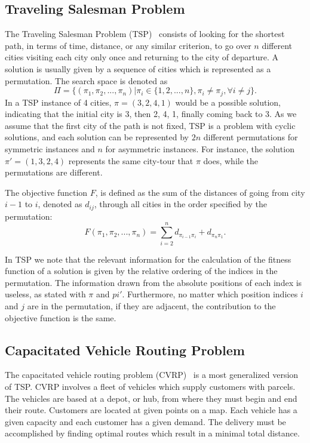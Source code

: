 \subsection{Traveling Salesman Problem}
The Traveling Salesman Problem (TSP)~\citep{goldberg1985alleles} consists of looking for the shortest path, in terms of time, distance, or any similar criterion, to go over $n$ different cities visiting each city only once and returning to the city of departure. A solution is usually given by a sequence of cities which is represented as a permutation. The search space is denoted as
\begin{equation*}
	\Pi = \{ (\pi_1, \pi_2,...,\pi_n) | \pi_i \in \{ 1,2,...,n \}, \pi_i \neq \pi_j, \forall i \neq j \}\text{.}
\end{equation*}
In a TSP instance of 4 cities, $\pi = (3,2,4,1)$ would be a possible solution, indicating that the initial city is 3, then 2, 4, 1, finally coming back to 3. As we assume that the first city of the path is not fixed, TSP is a problem with cyclic solutions, and each solution can be represented by $2n$ different permutations for symmetric instances and $n$ for asymmetric instances. For instance, the solution ${\pi}'=(1,3,2,4)$ represents the same city-tour that $\pi$ does, while the permutations are different.

The objective function $F$, is defined as the sum of the distances of going from city $i-1$ to $i$, denoted as $d_{ij}$, through all cities in the order specified by the permutation:
\begin{equation*}
	F(\pi_1, \pi_2, ... , \pi_n) = \sum_{i=2}^{n}{d_{\pi_{i-1}\pi_i}} + d_{\pi_n\pi_1} \text{.}
\end{equation*}

In TSP we note that the relevant information for the calculation of the fitness function of a solution is given by the relative ordering of the indices in the permutation. The information drawn from the absolute positions of each index is useless, as stated with $\pi$ and ${pi}'$. Furthermore, no matter which position indices $i$ and $j$ are in the permutation, if they are adjacent, the contribution to the objective function is the same.

\subsection{Capacitated Vehicle Routing Problem}
\label{section:cvrp}
The capacitated vehicle routing problem (CVRP)~\citep{toth2001vehicle} is a most generalized version of TSP. CVRP involves a fleet of vehicles which supply customers with parcels. The vehicles are based at a depot, or hub, from where they must begin and end their route. Customers are located at given points on a map. Each vehicle has a given capacity and each customer has a given demand. The delivery must be accomplished by finding optimal routes which result in a minimal total distance.

